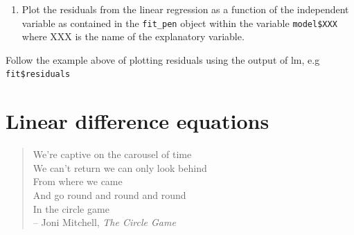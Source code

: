 \documentclass[
  letterpaper,
  DIV=11,
  numbers=noendperiod]{scrreprt}
\newenvironment{Shaded}{\begin{snugshade}}{\end{snugshade}}
\providecommand{\tightlist}{%
  \setlength{\itemsep}{0pt}\setlength{\parskip}{0pt}}\usepackage{longtable,booktabs,array}
\begin{document}
\begin{enumerate}
\def\labelenumi{\arabic{enumi}.}
\setcounter{enumi}{3}
\tightlist
\item
  Plot the residuals from the linear regression as a function of the
  independent variable as contained in the \texttt{fit\_pen} object
  within the variable \texttt{model\$XXX} where XXX is the name of the
  explanatory variable.
\end{enumerate}

\begin{Shaded}
\begin{Highlighting}[]

\end{Highlighting}
\end{Shaded}

\begin{tcolorbox}[enhanced jigsaw, arc=.35mm, colframe=quarto-callout-caution-color-frame, left=2mm, opacitybacktitle=0.6, breakable, title=\textcolor{quarto-callout-caution-color}{\faFire}\hspace{0.5em}{Hint}, toprule=.15mm, coltitle=black, bottomtitle=1mm, toptitle=1mm, colback=white, leftrule=.75mm, colbacktitle=quarto-callout-caution-color!10!white, titlerule=0mm, opacityback=0, rightrule=.15mm, bottomrule=.15mm]

Follow the example above of plotting residuals using the output of lm,
e.g \texttt{fit\$residuals}

\end{tcolorbox}


\hypertarget{linear-difference-equations}{%
\chapter{Linear difference
equations}\label{linear-difference-equations}}


\begin{quote}
We're captive on the carousel of time\\
We can't return we can only look behind\\
From where we came\\
And go round and round and round\\
In the circle game\\
-- Joni Mitchell, \emph{The Circle Game}
\end{quote}
\end{document}
